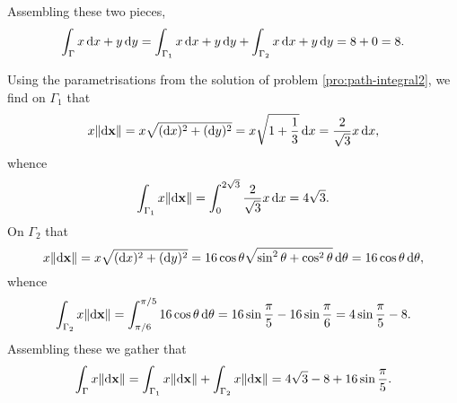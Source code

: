 \begin{multicols}{2}
\begin{problem}
\begin{answer}
\bigskip

Assembling these two pieces,
$$\dint _{\Gamma} x\d{x} + y\d{y} = \dint _{\Gamma _1} x\d{x} + y\d{y} +\dint _{\Gamma _2} x\d{x} + y\d{y}=8+0=8.    $$


\bigskip

Using the parametrisations from the solution of  problem
\ref{pro:path-integral2}, we find on $\Gamma _1$ that
$$ x\norm{\d{\point{x}}} = x\sqrt{(\d{x})^2+ (\d{y})^2} =x\sqrt{1+\dfrac{1}{3}}\d{x}=\dfrac{2}{\sqrt{3}}x\d{x},  $$
whence
$$ \dint _{\Gamma _1} x\norm{\d{\point{x}}} = \dint _0 ^{2\sqrt{3}}
\dfrac{2}{\sqrt{3}}x\d{x} = 4\sqrt{3}.  $$ On $\Gamma _2$ that
$$ x\norm{\d{\point{x}}} = x\sqrt{(\d{x})^2+ (\d{y})^2} =16\cos \theta\sqrt{\sin^2\theta + \cos^2\theta}\d{\theta}=16\cos\theta\d{\theta},  $$
whence
$$ \dint _{\Gamma _2} x\norm{\d{\point{x}}} = \dint _{\pi /6} ^{\pi /5}
16\cos\theta\d{\theta} = 16\sin \dfrac{\pi}{5} -16\sin
\dfrac{\pi}{6}= 4\sin \dfrac{\pi}{5}-8.
$$Assembling these we gather that
$$ \dint _{\Gamma } x\norm{\d{\point{x}}} =\dint _{\Gamma _1} x\norm{\d{\point{x}}}+\dint _{\Gamma _2}
x\norm{\d{\point{x}}}= 4\sqrt{3}-8+16\sin \dfrac{\pi}{5}.$$




\end{answer}
\end{problem}
\end{multicols}
